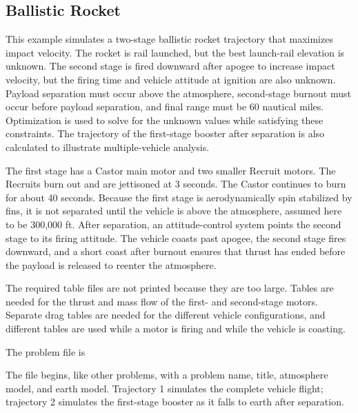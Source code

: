 \subsection{Ballistic Rocket}\label{sec:example-ballistic-rocket}

This example simulates a two-stage ballistic rocket trajectory that maximizes impact
velocity.  The rocket is rail launched, but the best launch-rail elevation is unknown.
The second stage is fired downward after apogee to increase impact velocity, but the
firing time and vehicle attitude at ignition are also unknown.  Payload separation
must occur above the atmosphere, second-stage burnout must occur before payload
separation, and final range must be 60 nautical miles.  Optimization is used to solve
for the unknown values while satisfying these constraints.  The trajectory of the
first-stage booster after separation is also calculated to illustrate multiple-vehicle
analysis.

The first stage has a Castor main motor and two smaller Recruit motors.  The Recruits
burn out and are jettisoned at 3 seconds.  The Castor continues to burn for about
40 seconds.  Because the first stage is aerodynamically spin stabilized by fins, it is
not separated until the vehicle is above the atmosphere, assumed here to be
300,000 ft.  After separation, an attitude-control system points the second stage to
its firing attitude.  The vehicle coasts past apogee, the second stage fires downward,
and a short coast after burnout ensures that thrust has ended before the payload is
released to reenter the atmosphere.

The required table files are not printed because they are too large.  Tables are needed
for the thrust and mass flow of the first- and second-stage motors.  Separate drag
tables are needed for the different vehicle configurations, and different tables are
used while a motor is firing and while the vehicle is coasting.


The problem file is



The file begins, like other problems, with a problem name, title, atmosphere model,
and earth model.  Trajectory 1 simulates the complete vehicle flight; trajectory 2
simulates the first-stage booster as it falls to earth after separation.


